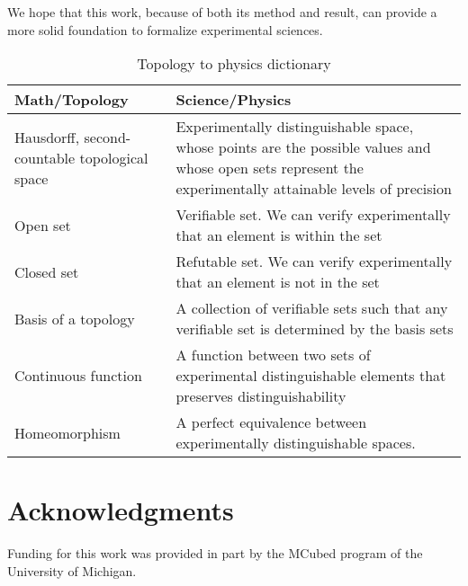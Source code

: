 \documentclass[review]{elsarticle}
\theoremstyle{plain}%
\theoremstyle{definition}
\theoremstyle{remark}
\begin{document}
We hope that this work, because of both its method and result, can provide a more solid foundation to formalize experimental sciences.

\begin{table}[h]
	\centering
\begin{tabular}{p{} p{}}
	Math/Topology & Science/Physics \\ 
	\hline 
	Hausdorff, second-countable topological space & Experimentally distinguishable space, whose points are the possible values and whose open sets represent the experimentally attainable levels of precision \\
	Open set & Verifiable set. We can verify experimentally that an element is within the set  \\ 
	Closed set & Refutable set. We can verify experimentally that an element is not in the set \\ 
	Basis of a topology & A collection of verifiable sets such that any verifiable set is determined by the basis sets\\
	Continuous \newline function &  A function between two sets of experimental distinguishable elements that preserves distinguishability \\
	Homeomorphism &  A perfect equivalence between experimentally distinguishable spaces. \\
\end{tabular} 
\caption{Topology to physics dictionary}
\end{table}

\section*{Acknowledgments}
Funding for this work was provided in part by the MCubed program of the University of Michigan.


\end{document}
